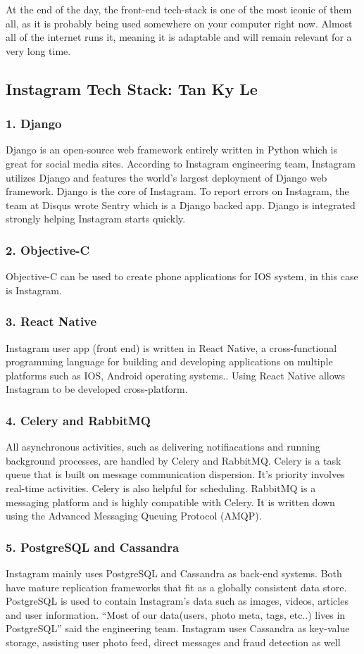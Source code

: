 \documentclass[a4paper, 11pt]{report}
\begin{document}
At the end of the day, the front-end tech-stack is one of the most iconic of them all, as it is probably being used somewhere on your computer right now. Almost all of the internet runs it, meaning it is adaptable and will remain relevant for a very long time.


\subsection{ Instagram Tech Stack: Tan Ky Le}
\subsubsection{1. Django}
 Django is an open-source web framework entirely written in Python which is great for social media sites. According to Instagram engineering team, Instagram utilizes Django and features the world’s largest deployment of Django web framework\cite{ky3}. Django is the core of Instagram. To report errors on Instagram, the team at Disqus wrote Sentry which is a Django backed app. Django is integrated strongly helping Instagram starts quickly\cite{ky4}. 
\subsubsection{2. Objective-C}
Objective-C can be used to create phone applications for IOS system, in this case is Instagram.
\subsubsection{3. React Native}
Instagram user app (front end) is written in React Native, a cross-functional programming language for building and developing applications on multiple platforms such as IOS, Android operating systems.\cite{ky7}. Using React Native allows Instagram to be developed cross-platform.
\subsubsection{4. Celery and RabbitMQ}
All asynchronous activities, such as delivering notifiacations and running background processes, are handled by Celery and RabbitMQ. Celery is a task queue that is built on message communication dispersion. It's priority involves real-time activities. Celery is also helpful for scheduling. RabbitMQ is a messaging platform and is highly compatible with Celery. It is written down using the Advanced Messaging Queuing Protocol (AMQP)\cite{ky4}.
\subsubsection{5. PostgreSQL and Cassandra}
Instagram mainly uses PostgreSQL and Cassandra as back-end systems. Both have mature replication frameworks that fit as a globally consistent data store\cite{ky5}. PostgreSQL is used to contain Instagram’s data such as images, videos, articles and user information\cite{ky4}. “Most of our data(users, photo meta, tags, etc..) lives in PostgreSQL” said the engineering team. Instagram uses Cassandra as key-value storage, assisting user photo feed, direct messages and fraud detection as well\cite{ky6}
\end{document}
